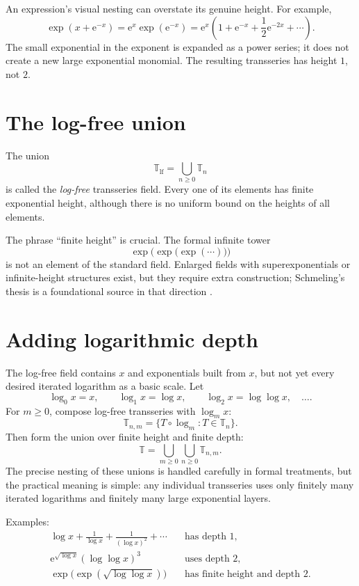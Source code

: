 \documentclass[11pt,openany]{book}
\theoremstyle{definition}
\theoremstyle{plain}
\theoremstyle{remark}
\newcommand{\T}{\mathbb{T}}
\newcommand{\e}{\mathrm{e}}
\begin{document}
An expression's visual nesting can overstate its genuine height. For example,
\[
 \exp(x+\e^{-x})
 =\e^x\exp(\e^{-x})
 =\e^x\left(1+\e^{-x}+\frac12\e^{-2x}+\cdots\right).
\]
The small exponential in the exponent is expanded as a power series; it does not create a new large exponential monomial. The resulting transseries has height $1$, not $2$.

\section{The log-free union}

The union
\begin{equation}\label{eq:logfree-T}
 \T_{\mathrm{lf}}=\bigcup_{n\ge0}\T_n
\end{equation}
is called the \emph{log-free} transseries field. Every one of its elements has finite exponential height, although there is no uniform bound on the heights of all elements.

The phrase ``finite height'' is crucial. The formal infinite tower
\[
 \exp\!\bigl(\exp\!\bigl(\exp(\cdots)\bigr)\bigr)
\]
is not an element of the standard field. Enlarged fields with superexponentials or infinite-height structures exist, but they require extra construction; Schmeling's thesis is a foundational source in that direction \cite{schmeling}.

\section{Adding logarithmic depth}

The log-free field contains $x$ and exponentials built from $x$, but not yet every desired iterated logarithm as a basic scale. Let
\[
 \log_0x=x,
 \qquad
 \log_1x=\log x,
 \qquad
 \log_2x=\log\log x,
 \quad\ldots.
\]
For $m\ge0$, compose log-free transseries with $\log_mx$:
\[
 \T_{n,m}=\{T\circ\log_m:T\in\T_n\}.
\]
Then form the union over finite height and finite depth:
\begin{equation}\label{eq:full-T}
 \T=\bigcup_{m\ge0}\bigcup_{n\ge0}\T_{n,m}.
\end{equation}
The precise nesting of these unions is handled carefully in formal treatments, but the practical meaning is simple: any individual transseries uses only finitely many iterated logarithms and finitely many large exponential layers.

Examples:
\begin{align*}
 \log x+\frac1{\log x}+\frac1{(\log x)^2}+\cdots
 &\quad\text{has depth }1,\\
 \e^{\sqrt{\log x}}(\log\log x)^3
 &\quad\text{uses depth }2,\\
 \exp\!\bigl(\exp(\sqrt{\log\log x})\bigr)
 &\quad\text{has finite height and depth }2.
\end{align*}
\end{document}
